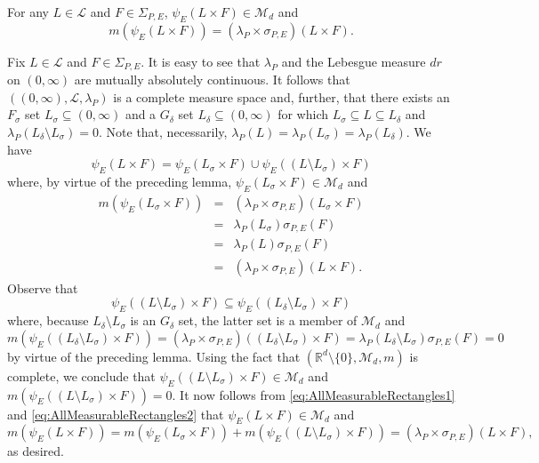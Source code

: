 \documentclass[smallextended]{svjour3}
\theoremstyle{remark}
\renewenvironment{proof}[1][\proofname]{\renewcommand\xproofname{#1}\xproof}{\endxproof}
\begin{document}
\begin{lemma}\label{lem:AllMeasurableRectangles} For any $L\in\mathcal{L}$ and $F\in \Sigma_{P,E}$, $\psi_E(L\times F)\in\mathcal{M}_d$ and 
\begin{equation*}
m(\psi_E(L\times F))=(\lambda_P\times\sigma_{P,E})(L\times F).
\end{equation*}
\end{lemma}
\begin{proof}
Fix $L\in\mathcal{L}$ and $F\in\Sigma_{P,E}$. It is easy to see that $\lambda_P$ and the Lebesgue measure $dr$ on $(0,\infty)$ are mutually absolutely continuous. It follows that $((0,\infty), \mathcal{L},\lambda_P)$ is a complete measure space and, further, that there exists an $F_\sigma$ set $L_\sigma\subseteq (0,\infty)$ and a $G_\delta$ set $L_\delta\subseteq (0,\infty)$ for which $L_\sigma\subseteq L\subseteq L_\delta$ and $\lambda_P(L_\delta\setminus L_\sigma)=0$. Note that, necessarily, $\lambda_P(L)=\lambda_P(L_\sigma)=\lambda_P(L_\delta)$. We have
\begin{equation}\label{eq:AllMeasurableRectangles1}
\psi_E(L\times F)=\psi_E( L_\sigma\times F)\cup\psi_E((L\setminus L_\sigma)\times F)
\end{equation}
where, by virtue of the preceding lemma, $\psi_E(L_\sigma\times F)\in \mathcal{M}_d$ and
\begin{eqnarray}\label{eq:AllMeasurableRectangles2}
m(\psi_E(L_{\sigma}\times F))
&=&(\lambda_P\times\sigma_{P,E})( L_\sigma\times F)\nonumber \\
&=&\lambda_P(L_\sigma)\sigma_{P,E}(F)\nonumber\\
&=&\lambda_P(L)\sigma_{P,E}(F)\nonumber\\
&=&(\lambda_P\times\sigma_{P,E})(L\times F).
\end{eqnarray}
Observe that
\begin{equation*}
\psi_E((L\setminus L_\sigma)\times F)\subseteq \psi_E((L_{\delta}\setminus L_\sigma)\times F)
\end{equation*}
where, because $L_\delta\setminus L_\sigma$ is an $G_{\delta}$ set, the latter set is a member of $\mathcal{M}_d$ and
\begin{equation*}
m(\psi_E((L_\delta\setminus L_\sigma)\times F))=(\lambda_P\times\sigma_{P,E})((L_\delta\setminus L_\sigma)\times F)=\lambda_P(L_\delta\setminus L_\sigma)\sigma_{P,E}(F)=0
\end{equation*}
by virtue of the preceding lemma. Using the fact that $(\mathbb{R}^d\setminus\{0\},\mathcal{M}_d,m)$ is complete, we conclude that $\psi_E((L\setminus L_\sigma)\times F)\in \mathcal{M}_d$ and $m(\psi_E((L\setminus L_\sigma)\times F))=0$. It now follows from \eqref{eq:AllMeasurableRectangles1} and \eqref{eq:AllMeasurableRectangles2} that $\psi_E(L\times F)\in\mathcal{M}_d$ and
\begin{equation*}
m(\psi_E(L\times F))=m(\psi_E(L_\sigma\times F))+m(\psi_E((L\setminus L_\sigma)\times F))=(\lambda_P\times\sigma_{P,E})(L\times F),
\end{equation*}
as desired.
\end{proof}
\end{document}
